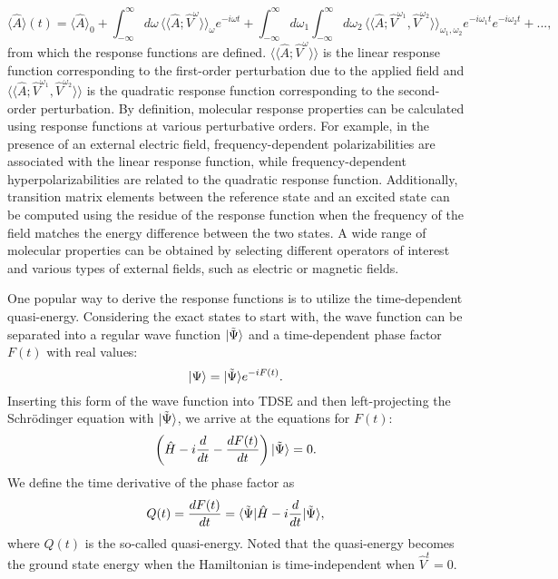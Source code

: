 \begin{equation}
\langle \hat{A}\rangle(t) = \langle \hat{A}\rangle_{0} + 
                                     \int_{-\infty}^{\infty} d\omega \,  \langle\langle \hat{A};\hat{V}^{\omega}\rangle\rangle_{\omega} e^{-i\omega t} + 
                                     \int_{-\infty}^{\infty} d\omega_{1} \int_{-\infty}^{\infty} d\omega_{2} \, 
                                     \langle\langle \hat{A};\hat{V}^{\omega_{1}}, \hat{V}^{\omega_{2}} \rangle\rangle_{\omega_{1}, \omega_{2}} e^{-i\omega_{1} t}e^{-i\omega_{2} t} + ...,
\label{eq:response-exp-val}                                   
\end{equation}
from which the response functions are defined. $\langle\langle \hat{A};\hat{V}^{\omega}\rangle\rangle$ is the linear response function corresponding to the first-order perturbation due to the applied field and $\langle\langle \hat{A};\hat{V}^{\omega_{1}}, \hat{V}^{\omega_{2}} \rangle\rangle$  is the quadratic response function corresponding to the second-order perturbation. By definition, molecular response properties can be calculated using response functions at various perturbative orders. For example, in the presence of an external electric field, frequency-dependent polarizabilities are associated with the linear response function, while frequency-dependent hyperpolarizabilities are related to the quadratic response function. Additionally, transition matrix elements between the reference state and an excited state can be computed using the residue of the response function when the frequency of the field matches the energy difference between the two states. A wide range of molecular properties can be obtained by selecting different operators of interest and various types of external fields, such as electric or magnetic fields.\cite{Helgaker2012, Mukherjee1979, Olsen1985, Luo1995, Autschbach2002, Crawford2006, Bast2011}

One popular way to derive the response functions is to utilize the time-dependent quasi-energy.\cite{Christiansen1998} Considering the exact states to start with, the wave function can be separated into a regular wave function $| \tilde{\Psi} \rangle$ and a time-dependent phase factor $F(t)$ with real values:
\begin{equation}
| \Psi \rangle = | \tilde{\Psi} \rangle e^{-iF(t)}.
\end{equation}
Inserting this form of the wave function into TDSE and then left-projecting the Schr\"odinger equation with $| \tilde{\Psi} \rangle$, we arrive at the equations for $F(t)$:
\begin{equation}
\left( \hat{H} - i\frac{d}{dt} - \frac{dF(t)}{dt} \right) | \tilde{\Psi} \rangle = 0.
\label{eq:response-quasi-SE}
\end{equation}
We define the time derivative of the phase factor as
\begin{equation}
Q(t) = \frac{dF(t)}{dt} = \langle\tilde{\Psi} |\hat{H}-i\frac{d}{dt}| \tilde{\Psi} \rangle,
\label{eq:response-quasi}
\end{equation}
where $Q(t)$ is the so-called quasi-energy. Noted that the quasi-energy becomes the ground state energy when the Hamiltonian is time-independent when $\hat{V}^{t} = 0$. 

